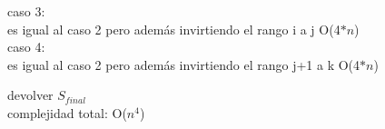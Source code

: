 \begin{algorithm}[H]
{{{{{				 
				 caso 3:\\
				 es igual al caso 2 pero además invirtiendo el rango i a j \hfill O(4$\ast n$)\\
				 
				 
				 caso 4: \\
				 es igual al caso 2 pero además invirtiendo el rango j+1 a k \hfill O(4$\ast n$)\\
				}
			}	
		}	
	}
	

	devolver $S_{final}$ \\

	\hfill complejidad total: O($n^4$)\\
}

\end{algorithm}

\begin{algorithm}[H]


\end{algorithm}

